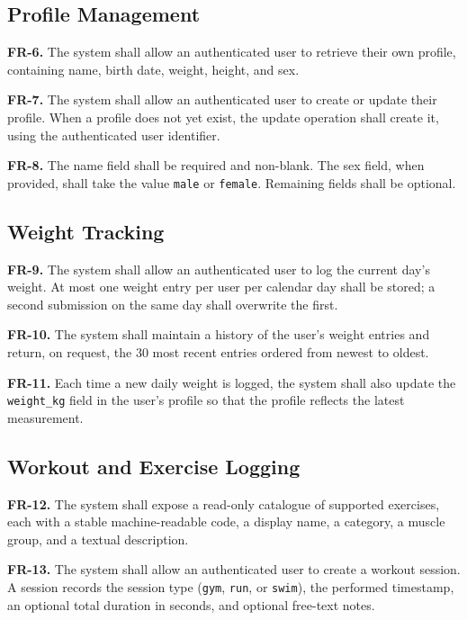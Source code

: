 \subsection{Profile Management}
\label{subsec:fr-profile}

\textbf{FR-6.} The system shall allow an authenticated user to retrieve their own profile, containing name, birth date, weight, height, and sex.

\textbf{FR-7.} The system shall allow an authenticated user to create or update their profile. When a profile does not yet exist, the update operation shall create it, using the authenticated user identifier.

\textbf{FR-8.} The name field shall be required and non-blank. The sex field, when provided, shall take the value \texttt{male} or \texttt{female}. Remaining fields shall be optional.

\subsection{Weight Tracking}
\label{subsec:fr-weight}

\textbf{FR-9.} The system shall allow an authenticated user to log the current day's weight. At most one weight entry per user per calendar day shall be stored; a second submission on the same day shall overwrite the first.

\textbf{FR-10.} The system shall maintain a history of the user's weight entries and return, on request, the 30 most recent entries ordered from newest to oldest.

\textbf{FR-11.} Each time a new daily weight is logged, the system shall also update the \texttt{weight\_kg} field in the user's profile so that the profile reflects the latest measurement.

\subsection{Workout and Exercise Logging}
\label{subsec:fr-workout}

\textbf{FR-12.} The system shall expose a read-only catalogue of supported exercises, each with a stable machine-readable code, a display name, a category, a muscle group, and a textual description.

\textbf{FR-13.} The system shall allow an authenticated user to create a workout session. A session records the session type (\texttt{gym}, \texttt{run}, or \texttt{swim}), the performed timestamp, an optional total duration in seconds, and optional free-text notes.

